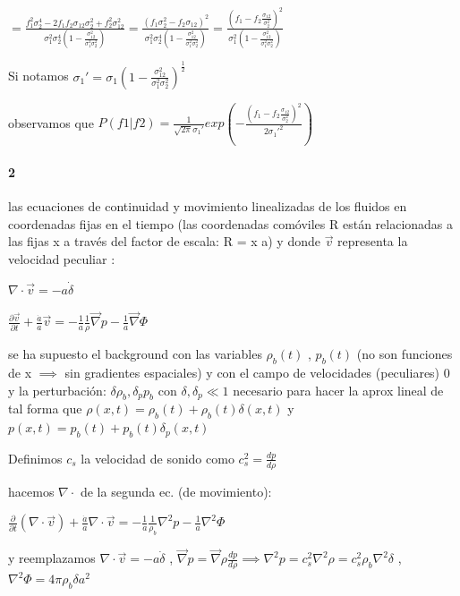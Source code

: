\documentclass[12pt]{book}
\begin{document}
$= \frac{f_1^2 \sigma_2^4  - 2 f_1 f_2 \sigma_{12} \sigma_2^2   + f_2^2 \sigma_{12}^2 }
{\sigma_1^2 \sigma_2^4(1- \frac{\sigma_{12}^2}{\sigma_1^2 \sigma_2^2 })}
= \frac{(f_1 \sigma_2^2  - f_2 \sigma_{12} )^2}
{\sigma_1^2 \sigma_2^4(1- \frac{\sigma_{12}^2}{\sigma_1^2 \sigma_2^2 })}
= \frac{(f_1  - f_2 \frac{\sigma_{12}}{\sigma_2^2} )^2}
{\sigma_1^2 (1- \frac{\sigma_{12}^2}{\sigma_1^2 \sigma_2^2 })}
$

Si notamos $\sigma_1' = \sigma_1(1- \frac{\sigma_{12}^2}{\sigma_1^2 \sigma_2^2 })^{\frac{1}{2}}$

observamos que 
$P(f1|f2) = \frac{1}{\sqrt{2\pi}\sigma_1'} 
exp(-\frac{(f_1  - f_2 \frac{\sigma_{12}}{\sigma_2^2} )^2}{2 \sigma_1'^2 })$


\paragraph{2}

las ecuaciones de continuidad y movimiento linealizadas de los fluidos en coordenadas fijas en el tiempo (las coordenadas
comóviles R están relacionadas a las fijas x a través del factor de escala: R = x a) y donde  $\vec{v}$ representa la velocidad peculiar :

$\nabla \cdot \vec{v} = -a \dot{\delta}$

$\frac{\partial \vec{v}}{\partial t} + \frac{\dot{a}}{a} \vec{v} = -\frac{1}{a} \frac{1}{\rho} \vec\nabla{p} - \frac{1}{a} \vec{\nabla}\Phi$

se ha supuesto el background con las variables $\rho_b(t)$ , $p_b(t)$ (no son funciones de x $\implies $ 
sin gradientes espaciales) y con el campo de velocidades (peculiares) 0
y la perturbación: $\delta \rho_b, \delta_p p_b$ con $\delta, \delta_p \ll 1$ 
necesario para hacer la aprox lineal de tal forma que $\rho(x,t) = \rho_b(t) + \rho_b(t) \delta(x,t)$ y 
$p(x,t) = p_b(t) + p_b(t) \delta_p(x,t)$ 

Definimos $c_s$ la velocidad de sonido  como $c_s^2 = \frac{dp}{d\rho}$

hacemos $\nabla \cdot $ de la segunda ec. (de movimiento):

$\frac{\partial }{\partial t} (\nabla \cdot \vec{v})+ \frac{\dot{a}}{a} \nabla \cdot \vec{v} = -\frac{1}{a} \frac{1}{\rho_b} \nabla^2{p} - \frac{1}{a} {\nabla}^2\Phi$

y reemplazamos $\nabla \cdot \vec{v} = -a \dot{\delta} $ ,  
$ \vec{\nabla}{p} = \vec{\nabla}{\rho}\frac{dp}{d\rho} \implies \nabla^2{p} = c_s^2 \nabla^2{\rho} = c_s^2 \rho_b \nabla^2 \delta$  , 
$\nabla^2 \Phi = 4 \pi \rho_b \delta a^2$ 
\end{document}
